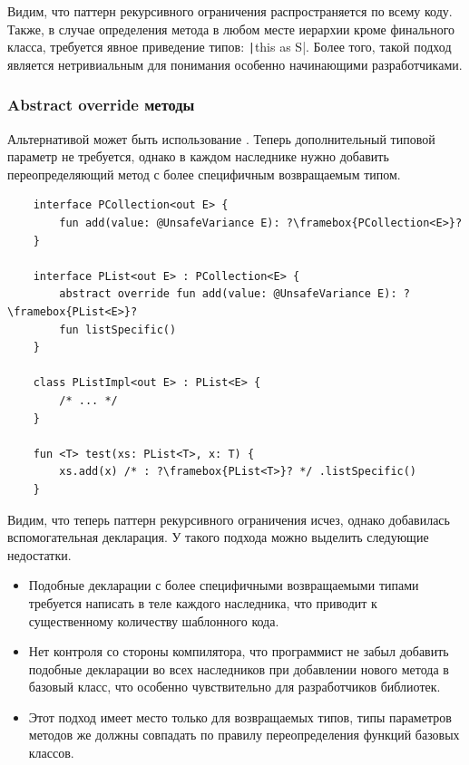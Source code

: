Видим, что паттерн рекурсивного ограничения распространяется по всему коду.
Также, в случае определения метода в любом месте иерархии кроме финального класса, требуется явное приведение типов: \texttt|this as S|.
Более того, такой подход является нетривиальным для понимания особенно начинающими разработчиками.

\subsubsection{Abstract override методы} \label{subsubsec:abstract-override}

Альтернативой может быть использование .
Теперь дополнительный типовой параметр не требуется, однако в каждом наследнике нужно добавить переопределяющий метод с более специфичным возвращаемым типом.

\begin{verbatim}
    interface PCollection<out E> {
        fun add(value: @UnsafeVariance E): ?\framebox{PCollection<E>}?
    }

    interface PList<out E> : PCollection<E> {
        abstract override fun add(value: @UnsafeVariance E): ?\framebox{PList<E>}?
        fun listSpecific()
    }

    class PListImpl<out E> : PList<E> {
        /* ... */
    }

    fun <T> test(xs: PList<T>, x: T) {
        xs.add(x) /* : ?\framebox{PList<T>}? */ .listSpecific()
    }
\end{verbatim}

Видим, что теперь паттерн рекурсивного ограничения исчез, однако добавилась вспомогательная декларация.
У такого подхода можно выделить следующие недостатки.

\begin{itemize}
    \item Подобные декларации с более специфичными возвращаемыми типами требуется написать в теле каждого наследника, что приводит к существенному количеству шаблонного кода.
    \item Нет контроля со стороны компилятора, что программист не забыл добавить подобные декларации во всех наследников при добавлении нового метода в базовый класс, что особенно чувствительно для разработчиков библиотек.
    \item Этот подход имеет место только для возвращаемых типов, типы параметров методов же должны совпадать по правилу переопределения функций базовых классов.
\end{itemize}

